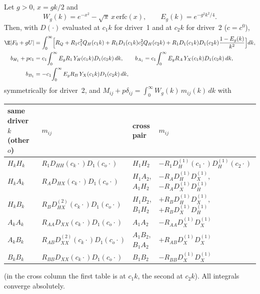 \begin{proposition}\label{tdb-prop:hankel}
Let $g>0$, $x=gk/2$ and
\[
W_g(k)=e^{-x^2}-\sqrt\pi\,x\,\mathrm{erfc}(x),\qquad E_g(k)=e^{-g^2k^2/4}.
\]
Then, with $D(\cdot)$ evaluated at $c_1k$ for driver~1 and at $c_2k$ for driver~2 ($c=c^0$),
\begin{align*}
\E|F_0+gU|&=\int_0^\infty\Bigl[R_Q+R_1c_1^2Q_H(c_1k)+R_1D_1(c_1k)c_2^2Q_H(c_2k)+R_1D_1(c_1k)D_1(c_2k)\frac{1-E_g(k)}{k^2}\Bigr]dk,\\
b_{H_1}+pc_1&=c_1\!\int_0^\infty E_gR_1\,Y_H(c_1k)D_1(c_2k)\,dk,\qquad
b_{A_1}=c_1\!\int_0^\infty E_gR_A\,Y_X(c_1k)D_1(c_2k)\,dk,\\
b_{B_1}&=-c_1\!\int_0^\infty E_gR_B\,Y_X(c_1k)D_1(c_2k)\,dk,
\end{align*}
symmetrically for driver~2, and $M_{ij}+p\delta_{ij}=\int_0^\infty W_g(k)\,m_{ij}(k)\,dk$ with
\begin{center}\small
\begin{tabular}{llll}\toprule
same driver $k$ (other $o$) & $m_{ij}$ & cross pair & $m_{ij}$\\\midrule
$H_kH_k$ & $R_1D_{HH}(c_k\cdot)D_1(c_o\cdot)$ & $H_1H_2$ & $-R_1D^{(1)}_H(c_1\cdot)D^{(1)}_H(c_2\cdot)$\\
$H_kA_k$ & $R_AD_{HX}(c_k\cdot)D_1(c_o\cdot)$ & $H_1A_2$, $A_1H_2$ & $-R_AD^{(1)}_HD^{(1)}_X$, $-R_AD^{(1)}_XD^{(1)}_H$\\
$H_kB_k$ & $R_BD^{(2)}_{HX}(c_k\cdot)D_1(c_o\cdot)$ & $H_1B_2$, $B_1H_2$ & $+R_BD^{(1)}_HD^{(1)}_X$, $+R_BD^{(1)}_XD^{(1)}_H$\\
$A_kA_k$ & $R_{AA}D_{XX}(c_k\cdot)D_1(c_o\cdot)$ & $A_1A_2$ & $-R_{AA}D^{(1)}_XD^{(1)}_X$\\
$A_kB_k$ & $R_{AB}D^{(2)}_{XX}(c_k\cdot)D_1(c_o\cdot)$ & $A_1B_2$, $B_1A_2$ & $+R_{AB}D^{(1)}_XD^{(1)}_X$\\
$B_kB_k$ & $R_{BB}D_{XX}(c_k\cdot)D_1(c_o\cdot)$ & $B_1B_2$ & $-R_{BB}D^{(1)}_XD^{(1)}_X$\\\bottomrule
\end{tabular}
\end{center}
(in the cross column the first table is at $c_1k$, the second at $c_2k$). All integrals converge absolutely.
\end{proposition}
